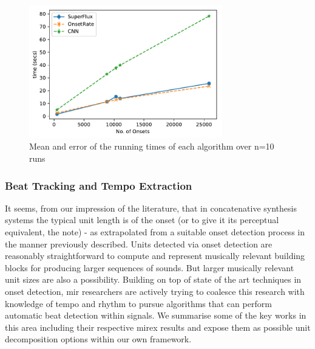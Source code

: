 {\begin{figure}
	\begin{center}
		\includegraphics[width=0.75\textwidth]{ch05_pyconcat/figures/onset_running_times.pdf}
	\end{center}
	\caption[Mean and error of the running times of each algorithm over n=10 runs]{Mean and error of the running times of each algorithm over n=10 runs}
	\label{fig:onset_running_times}
\end{figure}

\subsubsection{Beat Tracking and Tempo Extraction}

It seems, from our impression of the literature, that in concatenative synthesis systems the typical unit length is of the onset (or to give it its perceptual equivalent, the note)\citep{Schwarz2006, Frisson2010, Bernardes2013} - as extrapolated from a suitable onset detection process in the manner previously described. Units detected via onset detection are reasonably straightforward to compute and represent musically relevant building blocks for producing larger sequences of sounds. But larger musically relevant unit sizes are also a possibility.  Building on top of state of the art techniques in onset detection, \acrshort{mir} researchers are actively trying to coalesce this research with knowledge of tempo and rhythm to pursue algorithms that can perform automatic beat detection within signals. We summarise some of the key works in this area including their respective \acrshort{mirex} results and expose them as possible unit decomposition options within our own framework. 

}
